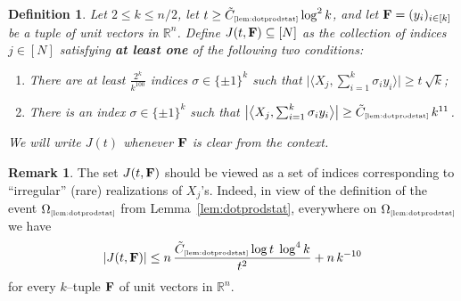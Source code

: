 \documentclass[11pt]{amsart}
\newtheorem{definition}[theorem]{Definition}
\theoremstyle{definition}
\newtheorem{remark}[theorem]{Remark}
\theoremstyle{plain}
\newcommand{\R}{\mathbb{R}}
\def\R{{\mathbb R}}
\begin{document}
\begin{definition}\label{def: Jt}
Let $2\leq k\leq n/2$, let $t\geq
\tilde C_{\text{\tiny\ref{lem:dotprodstat}}}
\log^{2} k$,
and let ${\bf F} = (y_i)_{i \in [k]}$ be a tuple
of unit vectors in $\R^n$.
Define $J(t, {\bf F}) \subseteq [N]$
as the collection of indices $j\in[N]$ satisfying {\bf at least
one} of the following two conditions: 
 \begin{enumerate}
    \item There are at least $\frac{2^k}{k^{100}}$ indices $\sigma \in \{\pm1\}^{k}$ such that $ \big|\big\langle X_j,\sum_{i=1}^k \sigma_i y_i\big\rangle\big|  \ge  t\,\sqrt{k}$; 
    \item There is an
    index $\sigma \in \{\pm1\}^{k}$
    such that $\big|\big\langle X_j,\sum_{i=1}^k \sigma_i y_i\big\rangle\big|
    \ge \tilde C_{\text{\tiny\ref{lem:dotprodstat}}}\,k^{11}$. 
\end{enumerate}
We will write $J(t)$ whenever
${\bf F}$ is clear from the context.
\end{definition}

\begin{remark}\label{rem: Jtsize}
The set $J(t, {\bf F})$ should be viewed as a set of indices corresponding to ``irregular''
(rare) realizations of $X_j$'s.
Indeed, in view of the definition of the event
$\Omega_{\text{\tiny\ref{lem:dotprodstat}}}$ from Lemma~\ref{lem:dotprodstat},
everywhere on $\Omega_{\text{\tiny\ref{lem:dotprodstat}}}$ we have
$$
|J(t, {\bf F})|\leq 
n\,\frac{\tilde C_{\text{\tiny\ref{lem:dotprodstat}}}\log t\;
\log^{4} k }{t^2}
+n\,k^{-10}
$$
for every $k$--tuple ${\bf F}$ of unit vectors in $\R^n$.
\end{remark}
\end{document}

